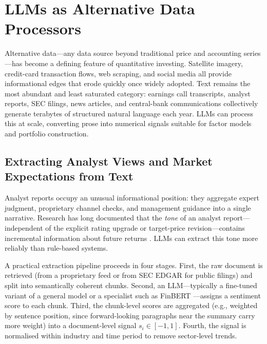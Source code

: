 \section{LLMs as Alternative Data Processors}
\label{sec:ch10-llms-alternative-data}

Alternative data---any data source beyond traditional price and accounting series---has
become a defining feature of quantitative investing. Satellite imagery, credit-card
transaction flows, web scraping, and social media all provide informational edges that
erode quickly once widely adopted. Text remains the most abundant and least saturated
category: earnings call transcripts, analyst reports, SEC filings, news articles, and
central-bank communications collectively generate terabytes of structured natural language
each year. LLMs can process this at scale, converting prose into numerical signals suitable
for factor models and portfolio construction.

\subsection{Extracting Analyst Views and Market Expectations from Text}
\label{sec:ch10-analyst-views-extraction}

Analyst reports occupy an unusual informational position: they aggregate expert
judgment, proprietary channel checks, and management guidance into a single narrative.
Research has long documented that the \emph{tone} of an analyst report---independent of
the explicit rating upgrade or target-price revision---contains incremental information
about future returns \citep{lehavy2011benefit}. LLMs can extract this tone more reliably
than rule-based systems.

A practical extraction pipeline proceeds in four stages. First, the raw document is
retrieved (from a proprietary feed or from SEC EDGAR for public filings) and split into
semantically coherent chunks. Second, an LLM---typically a fine-tuned variant of a general
model or a specialist such as FinBERT \citep{araci2019finbert}---assigns a sentiment score
to each chunk. Third, the chunk-level scores are aggregated (e.g., weighted by sentence
position, since forward-looking paragraphs near the summary carry more weight) into a
document-level signal $s_i \in [-1, 1]$. Fourth, the signal is normalised within
industry and time period to remove sector-level trends.

